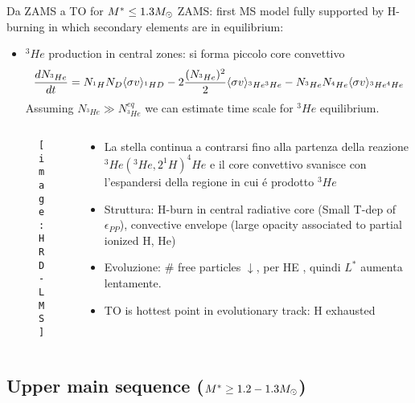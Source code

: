 \begin{frame}{Da ZAMS a TO for $M^*\leq1.3\msun{}$}
ZAMS: first MS model fully supported by H-burning in which secondary elements are in equilibrium:
\begin{itemize}
\item $^3He$ production in central zones: si forma piccolo core convettivo
    \[\TDy{t}{N_{^3He}}=N_{^1H}N_D\exv{\sigma v}_{^1HD}-2\frac{(N_{^3He})^2}{2}\exv{\sigma v}_{^3He^3He}-N_{^3He}N_{^4He}\exv{\sigma v}_{^3He^4He}\]
    Assuming $N_{^3He}\gg N_{^3He}^{eq}$ we can estimate time scale for $^3He$ equilibrium.
\end{itemize}
\begin{columns}[T]\begin{column}{0.5\textwidth}
\begin{figure}[!ht]\texttt{[image: HRD-LMS]}\label{fig:HRD-LMS}
\end{figure}
\end{column}\begin{column}{0.50\textwidth}
    \begin{itemize}
        \item La stella continua a contrarsi fino alla partenza della reazione $^3He(^3He,2^1H)^4He$ e il core convettivo svanisce con l'espandersi della regione in cui \'e prodotto $^3He$
        \item Struttura: H-burn in central radiative core (Small T-dep of $\epsilon_{PP}$), convective envelope (large opacity associated to partial ionized H, He)
        \item Evoluzione: $\#$ free particles $\downarrow$, \xaumenta{\mu} per HE ,  quindi $L^*$ aumenta lentamente.
        \item TO is hottest point in evolutionary track: H exhausted 
\end{itemize}
\end{column}\end{columns}
\end{frame}


\subsection{Upper main sequence ($M^*\geq1.2-1.3\msun{}$)}

